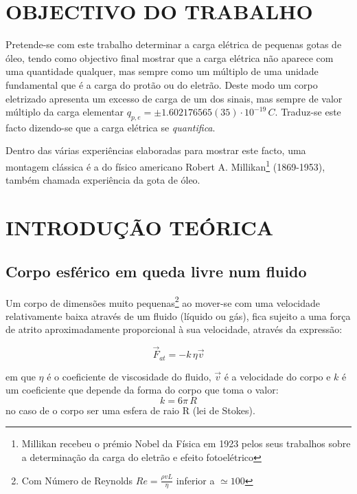 \documentclass[a4paper,twoside,12pt]{article}      %
\begin{document}
\begin{multicols}{2}

\section{\sf OBJECTIVO DO TRABALHO}
Pretende-se com este trabalho determinar a carga elétrica de pequenas gotas de óleo, tendo como objectivo final mostrar que a carga elétrica não aparece com uma quantidade qualquer, mas sempre como um múltiplo de uma unidade fundamental que é a carga do protão ou do eletrão. Deste modo um corpo eletrizado apresenta um excesso de carga de um dos sinais, mas sempre de valor múltiplo da carga elementar $q_{p,e}=\pm 1.602176565(35)\cdot 10^{-19}\,C$.
Traduz-se este facto dizendo-se que a carga elétrica se \emph{quantifica}.

Dentro das várias experiências elaboradas para mostrar este facto, uma montagem clássica é a do físico americano Robert A. Millikan\footnote{Millikan recebeu o prémio Nobel da Física em 1923 pelos seus trabalhos sobre a determinação da carga do eletrão e efeito fotoelétrico } (1869-1953), também chamada experiência da gota de óleo.

\section{\sf INTRODUÇÃO TEÓRICA}
\subsection{\sf Corpo esférico em queda livre num fluido}
Um corpo de dimensões muito pequenas\footnote{Com Número de Reynolds $Re= \frac{\rho v L}{\eta}$ inferior a $\simeq 100$}  ao mover-se com uma velocidade relativamente baixa através de um fluido (líquido ou gás), fica sujeito a uma força de atrito aproximadamente proporcional à sua velocidade, através da expressão:

\begin{equation}
	\label{eq:f_atrito}
	\vec{F}_{at} = - k \, \eta \vec{v}
\end{equation}

em que $\eta$ é o coeficiente de viscosidade do fluido, $\vec{v}$ é a velocidade do corpo e $k$ é um coeficiente que depende da forma do corpo  que toma o valor: 
\begin{equation}
	\label{eq:coef_atrito}
	k = 6 \pi \, R
\end{equation}
no caso de o corpo ser uma esfera de raio R (lei de Stokes).


\end{multicols}
\end{document}
